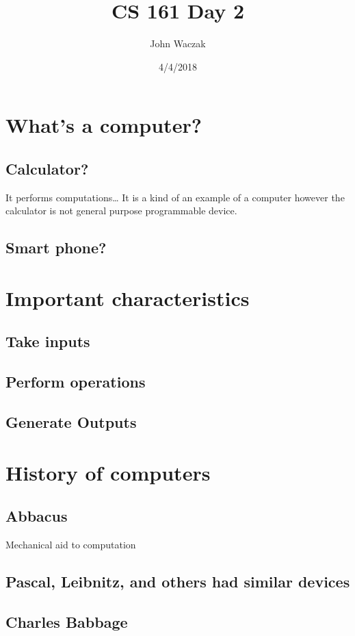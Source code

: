 \documentclass[11pt]{article}
\author{John Waczak}
\date{4/4/2018}
\title{CS 161 Day 2}
\begin{document}
\maketitle

\section{What's a computer?}
\label{sec-1}
\subsection{Calculator?}
\label{sec-1-1}
It performs computations\ldots{} It is a kind of an example of a
computer however the calculator is not general purpose programmable
device.

\subsection{Smart phone?}
\label{sec-1-2}
\section{Important characteristics}
\label{sec-2}
\subsection{Take inputs}
\label{sec-2-1}
\subsection{Perform operations}
\label{sec-2-2}
\subsection{Generate Outputs}
\label{sec-2-3}

\section{History of computers}
\label{sec-3}
\subsection{Abbacus}
\label{sec-3-1}
Mechanical aid to computation
\subsection{Pascal, Leibnitz, and others had similar devices}
\label{sec-3-2}
\subsection{Charles Babbage}
\label{sec-3-3}
\end{document}
